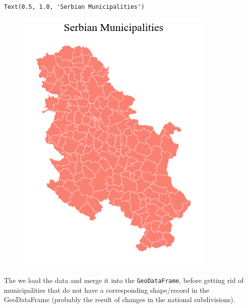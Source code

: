 \documentclass[
  letterpaper,
  DIV=11,
  numbers=noendperiod]{scrreprt}
\begin{document}
\begin{verbatim}
Text(0.5, 1.0, 'Serbian Municipalities')
\end{verbatim}

\begin{figure}[H]

{\centering \includegraphics{labs/w02_maps_files/figure-pdf/cell-26-output-2.png}

}

\end{figure}

The we load the data and merge it into the \texttt{GeoDataFrame}, before
getting rid of municipalities that do not have a corresponding
shape/record in the GeoDataFrame (probably the result of changes in the
national subdivisions).
\end{document}
